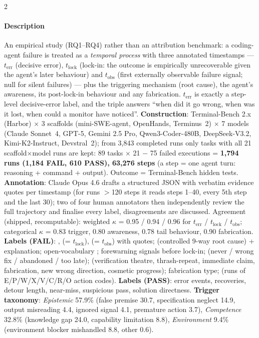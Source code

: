 \begin{multicols}{2}
\paragraph{Description} An empirical study (RQ1--RQ4) rather than an attribution benchmark: a coding-agent failure is treated as a \emph{temporal process} with three annotated timestamps --- $t_{\mathrm{err}}$ (decisive error), $t_{\mathrm{lock}}$ (lock-in: the outcome is empirically unrecoverable given the agent's later behaviour) and $t_{\mathrm{obs}}$ (first externally observable failure signal; null for silent failures) --- plus the triggering mechanism (root cause), the agent's awareness, its post-lock-in behaviour and any fabrication. $t_{\mathrm{err}}$ is exactly a step-level decisive-error label, and the triple answers ``when did it go wrong, when was it lost, when could a monitor have noticed''. \textbf{Construction}: Terminal-Bench 2.x (Harbor) $\times$ 3 scaffolds (mini-SWE-agent, OpenHands, Terminus~2) $\times$ 7 models (Claude Sonnet~4, GPT-5, Gemini 2.5 Pro, Qwen3-Coder-480B, DeepSeek-V3.2, Kimi-K2-Instruct, Devstral~2); from 3,843 completed runs only tasks with all 21 scaffold$\times$model runs are kept: 89 tasks $\times$ 21 $-$ 75 failed executions = \textbf{1,794 runs (1,184 FAIL, 610 PASS), 63,276 steps} (a step = one agent turn: reasoning + command + output). Outcome = Terminal-Bench hidden tests. \textbf{Annotation}: Claude Opus 4.6 drafts a structured JSON with verbatim evidence quotes per timestamp (for runs $>$120 steps it reads steps 1--40, every 5th step and the last 30); two of four human annotators then independently review the full trajectory and finalise every label, disagreements are discussed. Agreement (shipped, recomputable): weighted $\kappa$ = 0.95 / 0.94 / 0.96 for $t_{\mathrm{err}}$ / $t_{\mathrm{lock}}$ / $t_{\mathrm{obs}}$; categorical $\kappa$ = 0.83 trigger, 0.80 awareness, 0.78 tail behaviour, 0.90 fabrication. \textbf{Labels (FAIL)}: ,  (= $t_{\mathrm{lock}}$),  (= $t_{\mathrm{obs}}$) with  quotes;  (controlled 9-way root cause) + explanation; open-vocabulary ; forewarning signals before lock-in;  (never / wrong fix / abandoned / too late);  (verification theatre, thrash-repeat, immediate claim, fabrication, new wrong direction, cosmetic progress); fabrication type;  (runs of E/P/W/X/V/C/R/O action codes). \textbf{Labels (PASS)}: error events, recoveries, detour length, near-miss, suspicious pass, solution directness. \textbf{Trigger taxonomy}: \emph{Epistemic} 57.9\% (false premise 30.7, specification neglect 14.9, output misreading 4.4, ignored signal 4.1, premature action 3.7), \emph{Competence} 32.8\% (knowledge gap 24.0, capability limitation 8.8), \emph{Environment} 9.4\% (environment blocker mishandled 8.8, other 0.6).


\end{multicols}
